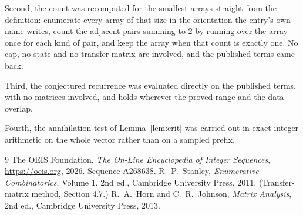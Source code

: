 \documentclass[11pt,a4paper]{article}
\theoremstyle{plain}
\theoremstyle{definition}
\begin{document}
Second, the count was recomputed for the smallest arrays straight from the definition:
enumerate every array of that size in the orientation the entry's own name writes, count the
adjacent pairs summing to $2$ by running over the array once for each kind of pair, and keep
the array when that count is exactly one. No cap, no state and no transfer matrix are involved, and
the published terms came back.

Third, the conjectured recurrence was evaluated directly on the published terms, with no
matrices involved, and holds wherever the proved range and the data overlap.

Fourth, the annihilation test of Lemma~\ref{lem:crit} was carried out in exact integer
arithmetic on the whole vector rather than on a sampled prefix.

\begin{thebibliography}{9}
 The OEIS Foundation, \emph{The On-Line Encyclopedia of Integer
Sequences}, \url{https://oeis.org}, 2026. Sequence A268638.
 R.~P.~Stanley, \emph{Enumerative Combinatorics}, Volume 1, 2nd ed.,
Cambridge University Press, 2011. (Transfer-matrix method, Section 4.7.)
 R.~A.~Horn and C.~R.~Johnson, \emph{Matrix Analysis}, 2nd ed., Cambridge
University Press, 2013.
\end{thebibliography}
\end{document}
